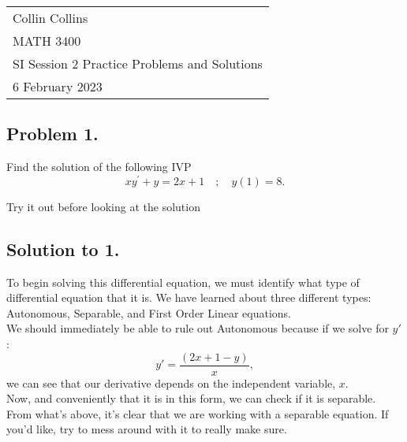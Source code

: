 \documentclass[a4paper,12pt]{article} %
\begin{document}



\thispagestyle{empty} %

\begin{tabular}{p{15.5cm}} %
\\ Collin Collins \\
MATH 3400\\
SI Session 2 Practice Problems and Solutions\\
6 February 2023 \\
\hline %

\end{tabular} 

\subsection*{Problem 1.}

Find the solution of the following IVP
$$ x y^{\prime}+y=2 x+1 \quad;\quad y(1)=8.$$

Try it out before looking at the solution

\pagebreak

\subsection*{Solution to 1.}

To begin solving this differential equation, we must identify what type of differential equation that it is. We have learned about three different types: Autonomous, Separable, and First Order Linear equations.\\

We should immediately be able to rule out Autonomous because if we solve for $y'$:
$$ y' = \frac{(2x+1 - y)}{x}, $$
we can see that our derivative depends on the independent variable, $x$.\\

Now, and conveniently that it is in this form, we can check if it is separable. From what's above, it's clear that we are working with a separable equation. If you'd like, try to mess around with it to really make sure.\\
\end{document}
